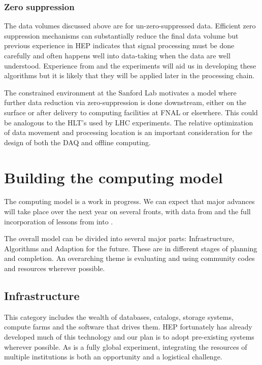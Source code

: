 \subsubsection{Zero suppression}

The data volumes discussed above are for un-zero-suppressed data.  Efficient zero suppression mechanisms can substantially reduce the final data volume but previous experience in HEP indicates that signal processing must be done carefully and often happens well into data-taking when the data are well understood.  Experience from   and the  experiments will aid us in developing these algorithms but it is likely that they will be applied later in the processing chain. 

The constrained environment at the Sanford Lab motivates a model where further data reduction via zero-suppression is done downstream, either on the surface or after delivery to computing facilities at FNAL or elsewhere. This could be analogous to the HLT's used by LHC experiments. The relative optimization of data movement and processing location is an important consideration for the design of both the DAQ and offline computing.





\section{Building the computing model}\label{sw:bld-cmp-mdl}

The   computing model is a work in progress.  We can expect that major advances will take place over the next year on several fronts, with data from  and the full incorporation of lessons from   into  . 


The overall model can be divided into several major parts:  Infrastructure, Algorithms and Adaption for the future.  These are in different stages of planning and completion.  An overarching theme is evaluating and using community codes and resources wherever possible. 



\subsection{Infrastructure}
This category includes the wealth of databases, catalogs, storage systems, compute farms and the software that drives them.  HEP fortunately has already developed much of this technology and our plan is to adopt pre-existing systems wherever possible.  As   is a fully global experiment, integrating the resources of multiple institutions is both an opportunity and a logistical challenge.

